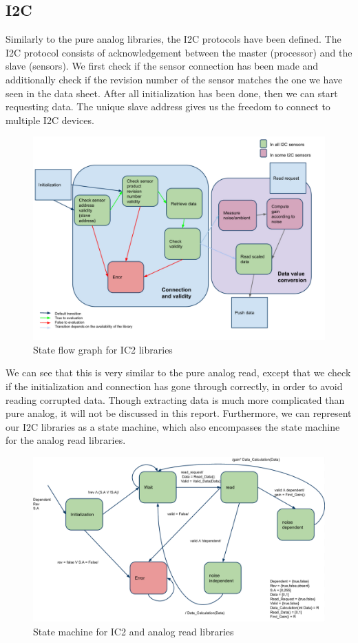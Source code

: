 \documentclass[10pt,twocolumn]{article}
\begin{document}
\subsection*{I2C}
Similarly to the pure analog libraries, the I2C protocols have been defined. The I2C protocol consists of acknowledgement between the master (processor) and the slave (sensors). We first check if the sensor connection has been made and additionally check if the revision number of the sensor matches the one we have seen in the data sheet. After all initialization has been done, then we can start requesting data. The unique slave address gives us the freedom to connect to multiple I2C devices.
\begin{figure}[h]
  \centering
    \includegraphics[scale=0.4]{ic2sm.png}
  \caption{State flow graph for IC2 libraries}
  \label{fig:ic2read}
\end{figure}

We can see that this is very similar to the pure analog read, except that we check if the initialization and connection has gone through correctly, in order to avoid reading corrupted data. Though extracting data is much more complicated than pure analog, it will not be discussed in this report. Furthermore, we can represent our I2C libraries as a state machine, which also encompasses the state machine for the analog read libraries.
\begin{figure}[h]
  \centering
    \includegraphics[scale=0.345]{libsm.png}
  \caption{State machine for IC2 and analog read libraries}
  \label{fig:sm_lib}
\end{figure}
\end{document}
